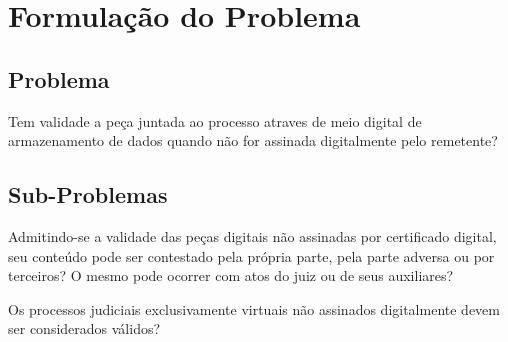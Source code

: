 \chapter{Formulação do Problema}

\section{Problema}
Tem validade a peça juntada ao processo atraves de meio digital de armazenamento de dados quando não for assinada digitalmente pelo remetente?

\section{Sub-Problemas}
Admitindo-se a validade das peças digitais não assinadas por certificado digital, seu conteúdo pode ser\cite{CertificadoDigital} contestado pela própria parte, pela parte adversa ou por terceiros? O mesmo pode ocorrer com atos do juiz ou de seus auxiliares?\par

Os processos judiciais exclusivamente virtuais não assinados digitalmente devem ser considerados válidos?
